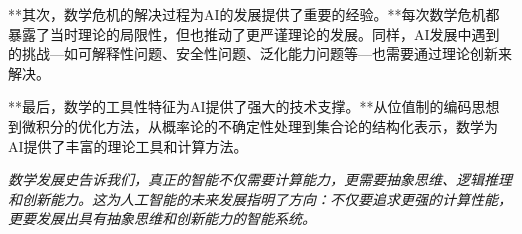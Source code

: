 **其次，数学危机的解决过程为AI的发展提供了重要的经验。**每次数学危机都暴露了当时理论的局限性，但也推动了更严谨理论的发展。同样，AI发展中遇到的挑战—如可解释性问题、安全性问题、泛化能力问题等—也需要通过理论创新来解决。

**最后，数学的工具性特征为AI提供了强大的技术支撑。**从位值制的编码思想到微积分的优化方法，从概率论的不确定性处理到集合论的结构化表示，数学为AI提供了丰富的理论工具和计算方法。

\emph{数学发展史告诉我们，真正的智能不仅需要计算能力，更需要抽象思维、逻辑推理和创新能力。这为人工智能的未来发展指明了方向：不仅要追求更强的计算性能，更要发展出具有抽象思维和创新能力的智能系统。}